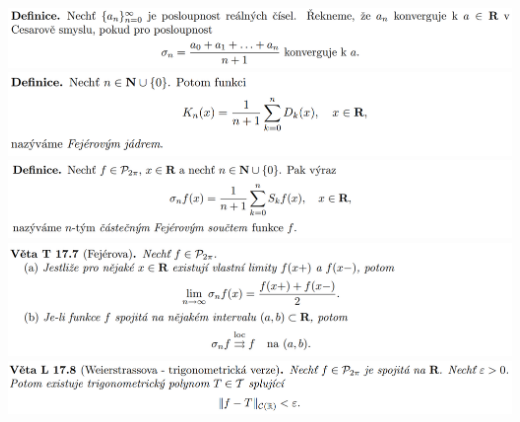 \documentclass[12pt,a4paper]{article}
\begin{document}
\begin{center}
		\includegraphics[width=\textwidth]{img/4four/2020-06-21 11 49 05.png}\vspace{0.3cm}
		\includegraphics[width=\textwidth]{img/4four/2020-06-21 11 49 12.png}\vspace{0.3cm}
		\includegraphics[width=\textwidth]{img/4four/2020-06-21 11 49 28.png}\vspace{0.3cm}
		\includegraphics[width=\textwidth]{img/4four/2020-06-21 11 49 36.png}\vspace{0.3cm}
		\includegraphics[width=\textwidth]{img/4four/2020-06-21 13 21 23.png}\vspace{0.3cm}
	\end{center}
	
\end{document}
